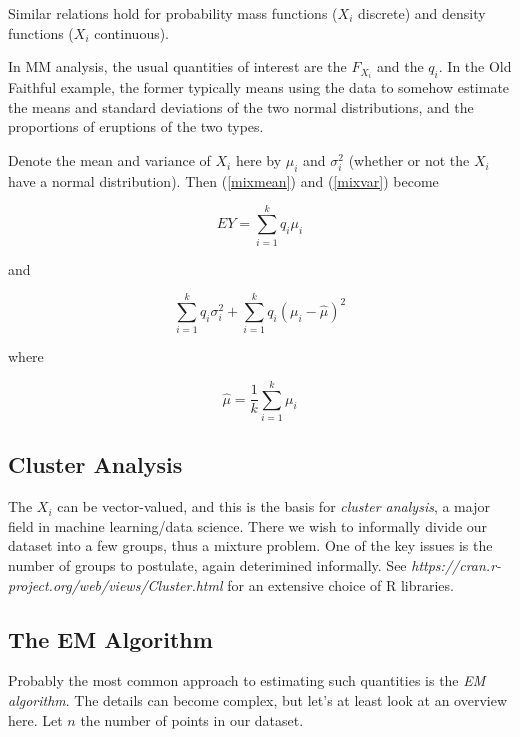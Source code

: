 \documentclass[11pt]{article}
\begin{document}
Similar relations hold for probability mass functions ($X_i$ discrete)
and density functions ($X_i$ continuous).

In MM analysis, the usual quantities of interest are the 
$F_{X_i}$ and the $q_i$.  In the Old Faithful example, the former 
typically means using the data to somehow estimate the means and
standard deviations of the two normal distributions, and the proportions
of eruptions of the two types.

Denote the mean and variance of $X_i$ here by $\mu_i$ and $\sigma_i^2$
(whether or not the $X_i$ have a normal distribution).  Then
(\ref{mixmean}) and (\ref{mixvar}) become

\begin{equation}
\label{MMexpmean}
EY = \sum_{i=1}^k q_i \mu_i
\end{equation}

and

\begin{equation}
\label{MMexpvar}
\sum_{i=1}^k q_i \sigma_i^2 +
\sum_{i=1}^k q_i (\mu_i - \hat{\mu})^2
\end{equation}

where

\begin{equation}
\hat{\mu} = \frac{1}{k} \sum_{i=1}^k \mu_i
\end{equation}

\subsection{Cluster Analysis}

The $X_i$ can be vector-valued, and this is the basis for
\textit{cluster analysis}, a major field in machine learning/data
science.  There we wish to informally divide our dataset into a few
groups, thus a mixture problem.  One of the key issues is the number of
groups to postulate, again deterimined informally.  See
\textit{https://cran.r-project.org/web/views/Cluster.html} for an
extensive choice of R libraries.

\subsection{The EM Algorithm}
\label{emForMM}

Probably the most common approach to estimating such quantities is the
\textit{EM algorithm}.  The details can become complex, but let's at
least look at an overview here.  Let $n$ the number of points in
our dataset.
\end{document}
